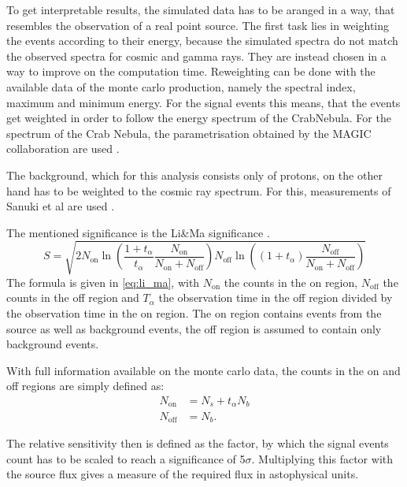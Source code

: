 To get interpretable results, the simulated data has to be 
aranged in a way, that resembles the observation of a real point source.
The first task lies in weighting the events according to their energy,
because the simulated spectra do not match the observed spectra for cosmic
and gamma rays. They are instead chosen in a way to improve on the
computation time.
Reweighting can be done with the available data of the monte carlo production,
namely the spectral index, maximum and minimum energy.
For the signal events this means, that the events get weighted in order
to follow the energy spectrum of the CrabNebula.
For the spectrum of the Crab Nebula, the parametrisation obtained by the MAGIC
collaboration are used \cite{aleksic2015measurement}.

The background, which for this analysis consists only of protons, 
on the other hand has to be weighted to the cosmic ray spectrum.
For this, measurements of Sanuki et al are used \cite{Sanuki_2000}.

The mentioned significance is the
Li\&Ma significance \cite{li1983analysis}.
\begin{equation}
    S = \sqrt{
        2N_\text{on}\ln
        \left(
            \frac{1+t_\alpha}{t_\alpha}
            \frac{N_\text{on}}{N_\text{on}+N_\text{off}}
        \right)
        N_\text{off}\ln
        \left(
            (1+t_\alpha)
            \frac{N_\text{off}}{N_\text{on}+N_\text{off}}
        \right)    
        }
    \label{eq:li_ma}
\end{equation}
The formula is given in \eqref{eq:li_ma}, with $N_\text{on}$
the counts in the on region, $N_\text{off}$ the counts in the off region
and $T_\alpha$ the observation time in the off region divided by the
observation time in the on region. The on region contains events from the
source as well as background events, the off region is assumed to contain only
background events. 

With full information available on the monte carlo data,
the counts in the on and off regions are simply defined as:
\begin{align*}
    N_\text{on} &= N_s + t_\alpha N_b \\
    N_\text{off} &= N_b.
\end{align*}

The relative sensitivity then is defined as the factor, by
which the signal events count has to be scaled to reach a significance
of 5$\sigma$. Multiplying this factor with the source flux gives 
a measure of the required flux in astophysical units.


